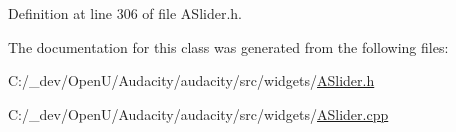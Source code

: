 Definition at line 306 of file A\+Slider.\+h.



The documentation for this class was generated from the following files\+:\begin{DoxyCompactItemize}
\item 
C\+:/\+\_\+dev/\+Open\+U/\+Audacity/audacity/src/widgets/\hyperlink{_a_slider_8h}{A\+Slider.\+h}\item 
C\+:/\+\_\+dev/\+Open\+U/\+Audacity/audacity/src/widgets/\hyperlink{_a_slider_8cpp}{A\+Slider.\+cpp}\end{DoxyCompactItemize}
